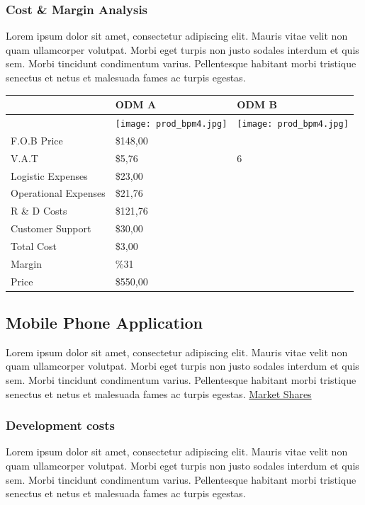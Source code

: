 \documentclass[11pt,titlepage]{article}
\begin{document}
\subsubsection{Cost \& Margin Analysis}
Lorem ipsum dolor sit amet, consectetur adipiscing elit. Mauris vitae velit 
non quam ullamcorper volutpat. Morbi eget turpis non justo sodales interdum 
et quis sem. Morbi tincidunt condimentum varius. Pellentesque habitant morbi 
tristique senectus et netus et malesuada fames ac turpis egestas.\newline
\begin{tabular}{ | l | l | l | }\hline
  & ODM A & ODM B \\ \hline
  & \texttt{[image: prod\_bpm4.jpg]} &
  \texttt{[image: prod\_bpm4.jpg]} \\ \hline
  F.O.B Price & \$148,00 &  \\ \hline
  V.A.T & \$5,76 & 6 \\ \hline
  Logistic Expenses & \$23,00 &  \\ \hline
  Operational Expenses & \$21,76 &  \\ \hline
  R \& D Costs & \$121,76 &  \\ \hline
  Customer Support & \$30,00 &  \\ \hline
  Total Cost & \$3,00 &  \\ \hline
  Margin & \%31 &  \\ \hline
  Price & \$550,00 &  \\ \hline
\end{tabular}
\pagebreak

\subsection{Mobile Phone Application}
Lorem ipsum dolor sit amet, consectetur adipiscing elit. Mauris vitae velit 
non quam ullamcorper volutpat. Morbi eget turpis non justo sodales interdum 
et quis sem. Morbi tincidunt condimentum varius. Pellentesque habitant morbi 
tristique senectus et netus et malesuada fames ac turpis egestas.\newline
\hyperlink{market_share}{Market Shares}
 
\subsubsection{Development costs}
Lorem ipsum dolor sit amet, consectetur adipiscing elit. Mauris vitae velit 
non quam ullamcorper volutpat. Morbi eget turpis non justo sodales interdum 
et quis sem. Morbi tincidunt condimentum varius. Pellentesque habitant morbi 
tristique senectus et netus et malesuada fames ac turpis egestas.\newline
\end{document}
